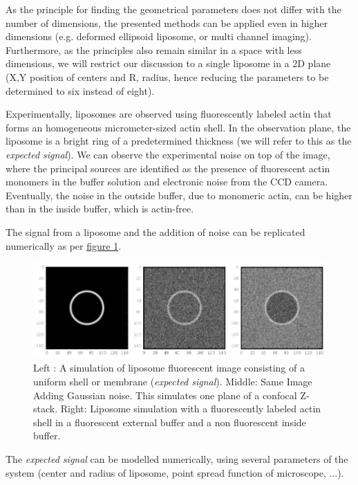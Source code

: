 \documentclass[A4paperpaper,11pt,english]{sphinxmanual}
\begin{document}
As the principle for finding the geometrical parameters does not differ with the
number of dimensions, the presented methods can be applied even in higher dimensions (e.g. deformed
ellipsoid liposome, or multi channel imaging). Furthermore, as the principles also remain  similar in a
space with less dimensions, we will restrict our discussion to a single liposome
in a 2D plane (X,Y position of centers and R, radius, hence reducing the parameters to be determined to six instead of eight).

Experimentally, liposomes are observed using fluorescently labeled actin that
forms an homogeneous micrometer-sized actin shell. In the observation plane,
the liposome is a bright ring of a predetermined thickness (we will refer to this as the
\emph{expected signal}). We can observe the experimental noise on top of the image, where the
principal sources are identified as the presence of fluorescent actin monomers in the
buffer solution and electronic noise from the CCD camera.
Eventually, the noise in the outside buffer, due to monomeric actin, can be higher than in the inside buffer, which is actin-free.

The signal from a liposome and the addition of noise can be replicated
numerically as per \hyperref[parts/part4:fig-2d-sim]{figure  \ref*{parts/part4:fig-2d-sim}}.
\begin{figure}[htbp]
\centering
\capstart

\includegraphics{modl-2D-doublet.png}
\caption{Left : A simulation of liposome fluorescent image consisting of a uniform shell or membrane
(\emph{expected signal}).  Middle: Same Image Adding Gaussian noise. This simulates
one plane of a confocal Z-stack.  Right: Liposome simulation   with
a fluorescently labeled actin shell in a fluorescent external buffer and a non
fluorescent inside buffer.}\label{parts/part4:fig-2d-sim}\end{figure}

The \emph{expected signal} can be modelled numerically, using several parameters of
the system (center and radius of liposome, point spread function of microscope,
...).
\end{document}
